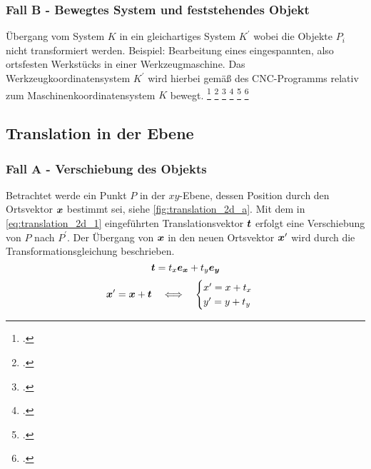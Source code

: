 \subsubsection{Fall B - Bewegtes System und feststehendes Objekt}
Übergang vom System $K$ in ein gleichartiges System $K^\prime$ wobei die Objekte $P_{i}$ nicht transformiert werden. Beispiel: Bearbeitung eines eingespannten, also ortsfesten Werkstücks in einer Werkzeugmaschine. Das Werkzeugkoordinatensystem $K^\prime$ wird hierbei gemäß des CNC-Programms relativ zum Maschinenkoordinatensystem $K$ bewegt. 
\footcite[Vgl.][1-2]{Neugebauer2006}
\footcite[Vgl.][95]{Keferstein2018}
\footcite[Vgl.][8-20]{Wloka1994}
\footcite[Vgl.][38\psqq]{Bartsch2014}
\footcite[Vgl.][33]{Pfeifer2010}
\footcite[Vgl.][12]{Schuth2017}
\newpage
\subsection{Translation in der Ebene}
\label{subsec:translation_2d}
\subsubsection{Fall A - Verschiebung des Objekts}
Betrachtet werde ein Punkt $P$ in der $xy$-Ebene, dessen Position durch den Ortsvektor $\boldsymbol{x}$ bestimmt sei, siehe \cref{fig:translation_2d_a}. Mit dem in \cref{eq:translation_2d_1} eingeführten Translationsvektor $\boldsymbol{t}$ erfolgt eine Verschiebung von $P$ nach $P^\prime$. Der Übergang von $\boldsymbol{x}$ in den neuen Ortsvektor $\boldsymbol{x}^\prime$ wird durch die Transformationsgleichung  beschrieben.
\begin{equation}
    \boldsymbol{t} = t_{x}\boldsymbol{{e_{x}}}+t_{y}\boldsymbol{e_{y}} \label{eq:translation_2d_1}
\end{equation}
\begin{equation}
    \boldsymbol{x}^\prime = \boldsymbol{x}+\boldsymbol{t} 
    \quad\Longleftrightarrow\quad
    \begin{cases}
        x^\prime=x+t_{x}\\
        y^\prime=y+t_{y}
    \end{cases}
    \label{eq:translation_2d_2}\\
\end{equation}

